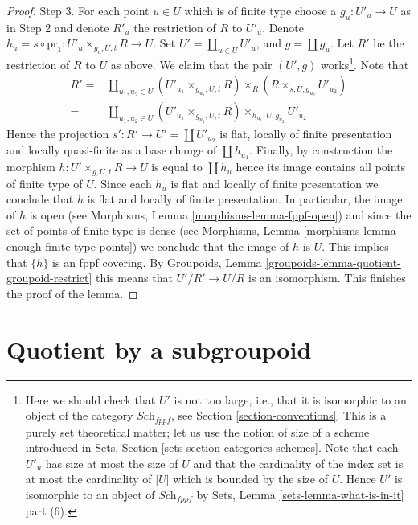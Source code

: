 \begin{proof}
\medskip\noindent
Step 3. For each point $u \in U$ which is of finite type
choose a $g_u : U'_u \to U$ as in
Step 2 and denote $R'_u$ the restriction of $R$ to $U'_u$.
Denote $h_u = s \circ \text{pr}_1 : U'_u \times_{g_u, U, t} R \to U$. Set
$U' = \coprod_{u \in U} U'_u$, and $g = \coprod g_u$. Let $R'$ be the
restriction of $R$ to $U$ as above. We claim that
the pair $(U', g)$ works\footnote{Here we should check that $U'$ is not
too large, i.e., that it is isomorphic to an object of the category
$\textit{Sch}_{fppf}$, see
Section \ref{section-conventions}.
This is a purely set theoretical matter; let us use the notion of size of
a scheme introduced in
Sets, Section \ref{sets-section-categories-schemes}.
Note that each $U'_u$ has size at most the size of $U$
and that the cardinality of the index set is at most the cardinality of
$|U|$ which is bounded by the size of $U$. Hence $U'$ is isomorphic
to an object of $\textit{Sch}_{fppf}$ by
Sets, Lemma \ref{sets-lemma-what-is-in-it} part (6).}.
Note that
\begin{align*}
R' = &
\coprod\nolimits_{u_1, u_2 \in U}
(U'_{u_1} \times_{g_{u_1}, U, t} R)
\times_R
(R \times_{s, U, g_{u_2}} U'_{u_2}) \\
= &
\coprod\nolimits_{u_1, u_2 \in U}
(U'_{u_1} \times_{g_{u_1}, U, t} R) \times_{h_{u_1}, U, g_{u_2}} U'_{u_2}
\end{align*}
Hence the projection $s' : R' \to U' = \coprod U'_{u_2}$
is flat, locally of finite
presentation and locally quasi-finite as a base change of $\coprod h_{u_1}$.
Finally, by construction the morphism
$h : U' \times_{g, U, t} R \to U$ is equal to $\coprod h_{u}$ hence
its image contains all points of finite type of $U$.
Since each $h_u$ is flat and locally of finite presentation we conclude that
$h$ is flat and locally of finite presentation.
In particular, the image of $h$ is open (see
Morphisms, Lemma \ref{morphisms-lemma-fppf-open})
and since the set of points of finite type is dense (see
Morphisms, Lemma \ref{morphisms-lemma-enough-finite-type-points})
we conclude that the image of $h$ is $U$. This implies that
$\{h\}$ is an fppf covering. By
Groupoids, Lemma \ref{groupoids-lemma-quotient-groupoid-restrict} 
this means that $U'/R' \to U/R$ is an isomorphism.
This finishes the proof of the lemma.
\end{proof}










\section{Quotient by a subgroupoid}
\label{section-dividing}


